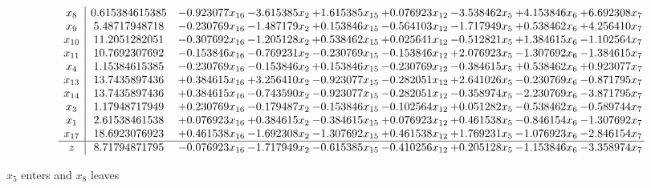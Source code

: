 \documentclass[10pt]{article}
\begin{document}
 \[\begin{array}{c| c c@{\hskip 2pt} c@{\hskip 2pt} c@{\hskip 2pt} c@{\hskip 2pt} c@{\hskip 2pt} c@{\hskip 2pt} c@{\hskip 2pt} }
 x_{8}   &  0.615384615385 & -0.923077 x_{16} & -3.615385 x_{2} & + 1.615385 x_{15} & + 0.076923 x_{12} & -3.538462 x_{5} & + 4.153846 x_{6} & + 6.692308 x_{7}\\
 x_{9}   &  5.48717948718 & -0.230769 x_{16} & -1.487179 x_{2} & + 0.153846 x_{15} & -0.564103 x_{12} & -1.717949 x_{5} & + 0.538462 x_{6} & + 4.256410 x_{7}\\
 x_{10}   &  11.2051282051 & -0.307692 x_{16} & -1.205128 x_{2} & + 0.538462 x_{15} & + 0.025641 x_{12} & -0.512821 x_{5} & + 1.384615 x_{6} & -1.102564 x_{7}\\
 x_{11}   &  10.7692307692 & -0.153846 x_{16} & -0.769231 x_{2} & -0.230769 x_{15} & -0.153846 x_{12} & + 2.076923 x_{5} & -1.307692 x_{6} & -1.384615 x_{7}\\
 x_{4}   &  1.15384615385 & -0.230769 x_{16} & -0.153846 x_{2} & + 0.153846 x_{15} & -0.230769 x_{12} & -0.384615 x_{5} & + 0.538462 x_{6} & + 0.923077 x_{7}\\
 x_{13}   &  13.7435897436 & + 0.384615 x_{16} & + 3.256410 x_{2} & -0.923077 x_{15} & -0.282051 x_{12} & + 2.641026 x_{5} & -0.230769 x_{6} & -0.871795 x_{7}\\
 x_{14}   &  13.7435897436 & + 0.384615 x_{16} & -0.743590 x_{2} & -0.923077 x_{15} & -0.282051 x_{12} & -0.358974 x_{5} & -2.230769 x_{6} & -3.871795 x_{7}\\
 x_{3}   &  1.17948717949 & + 0.230769 x_{16} & -0.179487 x_{2} & -0.153846 x_{15} & -0.102564 x_{12} & + 0.051282 x_{5} & -0.538462 x_{6} & -0.589744 x_{7}\\
 x_{1}   &  2.61538461538 & + 0.076923 x_{16} & + 0.384615 x_{2} & -0.384615 x_{15} & + 0.076923 x_{12} & + 0.461538 x_{5} & -0.846154 x_{6} & -1.307692 x_{7}\\
 x_{17}   &  18.6923076923 & + 0.461538 x_{16} & -1.692308 x_{2} & -1.307692 x_{15} & + 0.461538 x_{12} & + 1.769231 x_{5} & -1.076923 x_{6} & -2.846154 x_{7}\\
\hline
z    &  8.71794871795 & -0.076923 x_{16} & -1.717949 x_{2} & -0.615385 x_{15} & -0.410256 x_{12} & + 0.205128 x_{5} & -1.153846 x_{6} & -3.358974 x_{7}\\
\end{array}\]


 $ x_{5} $ enters and $ x_{8} $ leaves 
\end{document}
